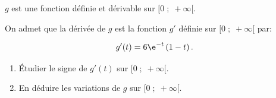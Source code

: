 \medskip

$g$ est une fonction définie et dérivable sur $[0\;;\;+\infty[$.

On admet que la dérivée de $g$ est la fonction $g'$ définie sur $[0\;;\;+\infty[$ par: 

\[g'(t)=6\e^{-t}\left (1-t\right ).\]

\begin{enumerate}
\item  Étudier le signe de $g'(t)$ sur $[0\;;\;+\infty[$.
\item En déduire les variations de $g$ sur $[0\;;\;+\infty[$.
\end{enumerate}

\bigskip
